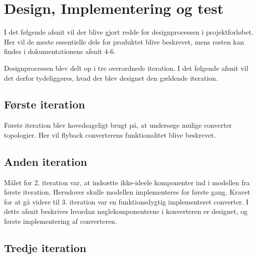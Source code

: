 \chapter{Design, Implementering og test}
I det følgende afsnit vil der blive gjort redde for designprocessen i projektforløbet. Her vil de meste essentielle dele for produktet blive beskrevet, mens resten kan findes i dokumentationens afsnit 4-6.

Designprocessen blev delt op i tre overordnede iteration. I det følgende afsnit vil det derfor tydeliggøres, hvad der blev designet den gældende iteration. 

\section{Første iteration} 
Første iteration blev hovedsageligt brugt på, at undersøge mulige converter topologier. Her vil flyback converterens funktionalitet blive beskrevet. 




\section{Anden iteration}
Målet for 2. iteration var, at indsætte ikke-ideele komponenter ind i modellen fra første iteration. Herudover skulle modellen implementeres for første gang. 
Kravet for at gå videre til 3. iteration var en funktionsdygtig implementeret converter. 
I dette afsnit beskrives hvordan nøglekomponenterne i konverteren er designet, og første implementering af converteren.





\section{Tredje iteration}






	
	
